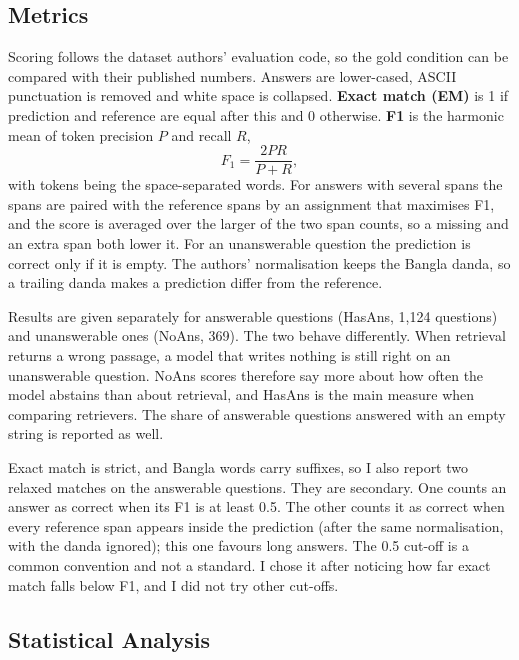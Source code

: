 \subsection{Metrics}

Scoring follows the dataset authors' evaluation code, so the gold condition can be compared with their published numbers. Answers are lower-cased, ASCII punctuation is removed and white space is collapsed. \textbf{Exact match (EM)} is 1 if prediction and reference are equal after this and 0 otherwise. \textbf{F1} is the harmonic mean of token precision $P$ and recall $R$,
\begin{equation}
	F_1 = \frac{2PR}{P + R},
\end{equation}
with tokens being the space-separated words. For answers with several spans the spans are paired with the reference spans by an assignment that maximises F1, and the score is averaged over the larger of the two span counts, so a missing and an extra span both lower it. For an unanswerable question the prediction is correct only if it is empty. The authors' normalisation keeps the Bangla danda, so a trailing danda makes a prediction differ from the reference.

Results are given separately for answerable questions (HasAns, 1,124 questions) and unanswerable ones (NoAns, 369). The two behave differently. When retrieval returns a wrong passage, a model that writes nothing is still right on an unanswerable question. NoAns scores therefore say more about how often the model abstains than about retrieval, and HasAns is the main measure when comparing retrievers. The share of answerable questions answered with an empty string is reported as well.

Exact match is strict, and Bangla words carry suffixes, so I also report two relaxed matches on the answerable questions. They are secondary. One counts an answer as correct when its F1 is at least 0.5. The other counts it as correct when every reference span appears inside the prediction (after the same normalisation, with the danda ignored); this one favours long answers. The 0.5 cut-off is a common convention and not a standard. I chose it after noticing how far exact match falls below F1, and I did not try other cut-offs.

\subsection{Statistical Analysis}

